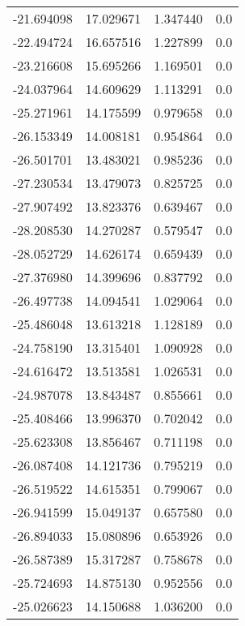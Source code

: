 \begin{tabular}{rrrr}
      -21.694098 &        17.029671 &    1.347440 &   0.0 \\
      -22.494724 &        16.657516 &    1.227899 &   0.0 \\
      -23.216608 &        15.695266 &    1.169501 &   0.0 \\
      -24.037964 &        14.609629 &    1.113291 &   0.0 \\
      -25.271961 &        14.175599 &    0.979658 &   0.0 \\
      -26.153349 &        14.008181 &    0.954864 &   0.0 \\
      -26.501701 &        13.483021 &    0.985236 &   0.0 \\
      -27.230534 &        13.479073 &    0.825725 &   0.0 \\
      -27.907492 &        13.823376 &    0.639467 &   0.0 \\
      -28.208530 &        14.270287 &    0.579547 &   0.0 \\
      -28.052729 &        14.626174 &    0.659439 &   0.0 \\
      -27.376980 &        14.399696 &    0.837792 &   0.0 \\
      -26.497738 &        14.094541 &    1.029064 &   0.0 \\
      -25.486048 &        13.613218 &    1.128189 &   0.0 \\
      -24.758190 &        13.315401 &    1.090928 &   0.0 \\
      -24.616472 &        13.513581 &    1.026531 &   0.0 \\
      -24.987078 &        13.843487 &    0.855661 &   0.0 \\
      -25.408466 &        13.996370 &    0.702042 &   0.0 \\
      -25.623308 &        13.856467 &    0.711198 &   0.0 \\
      -26.087408 &        14.121736 &    0.795219 &   0.0 \\
      -26.519522 &        14.615351 &    0.799067 &   0.0 \\
      -26.941599 &        15.049137 &    0.657580 &   0.0 \\
      -26.894033 &        15.080896 &    0.653926 &   0.0 \\
      -26.587389 &        15.317287 &    0.758678 &   0.0 \\
      -25.724693 &        14.875130 &    0.952556 &   0.0 \\
      -25.026623 &        14.150688 &    1.036200 &   0.0 \\

\end{tabular}

